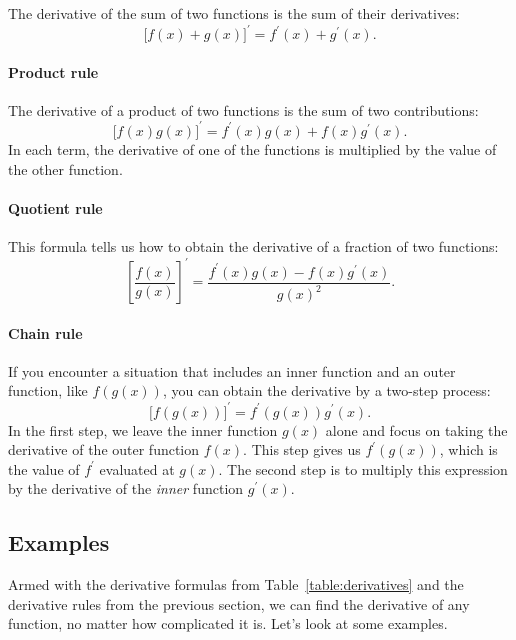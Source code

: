 			The derivative of the sum of two functions
			is the sum of their derivatives:
			\[
				\big[ f(x) +  g(x) \big]^\prime	=	f^{\prime\!}(x) + g^{\prime\!}(x).
			\]



		\paragraph{Product rule}

			The derivative of a product of two functions
			is the sum of two contributions:
			\[
				\big[ f(x)g(x) \big]^\prime 		= 	f^{\prime\!}(x)g(x)  + f(x)g^{\prime\!}(x).
			\]
			In each term,
			the derivative of one of the functions
			is multiplied by the value of the other function.


		\paragraph{Quotient rule}

			This formula tells us how to obtain the derivative of a fraction of two functions:
			\[
				\left[ \frac{f(x)}{g(x)} \right]^\prime =	\frac{f^{\prime\!}(x)g(x)-f(x)g^{\prime\!}(x)}{g(x)^2}.
			\]


		\paragraph{Chain rule}
			If you encounter a situation that includes an inner function and an outer function,
			like $f(g(x))$, you can obtain the derivative by a two-step process:
			\[
				\big[ f(g(x)) \big]^\prime	= 	f^{\prime\!}(g(x))g^{\prime\!}(x).
			\]
			In the first step,
			we leave the inner function $g(x)$ alone
			and focus on taking the derivative of the outer function $f(x)$.
			This step gives us $f^{\prime\!}(g(x))$,
			which is the value of $f^{\prime}$ evaluated at $g(x)$.
			The second step
			is to multiply this expression by the derivative of the \emph{inner} function $g^{\prime\!}(x)$.



	\subsection{Examples}

		Armed with the derivative formulas from Table~\ref{table:derivatives}
		and the derivative rules from the previous section,
		we can find the derivative of any function,
		no matter how complicated it is.
		Let's look at some examples.

